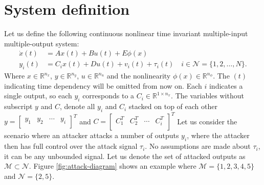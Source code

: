 \section{System definition}\label{ch:system-definition}
Let us define the following continuous nonlinear time invariant multiple-input multiple-output system:
\begin{equation}\label{eqn:standard-system}
    \begin{split}
        \dot{x}(t) &= Ax(t) + Bu(t) + E\phi(x) \\
        y_i(t) &= C_ix(t) + Du(t) + v_i(t) + \tau_i(t) \quad i \in \mathcal{N} = \{1,2,\dots,N\}.
    \end{split}
\end{equation}
Where $x \in \mathbb{R}^{n_x}$, $y \in \mathbb{R}^{n_y}$, $u \in \mathbb{R}^{n_u}$ and the nonlinearity $\phi(x) \in \mathbb{R}^{n_{\phi}}$. The $(t)$ indicating time dependency will be omitted from now on. Each $i$ indicates a single output, so each $y_i$ corresponds to a $C_i \in \mathbb{R}^{1 \times n_x}$. The variables without subscript $y$ and $C$, denote all $y_i$ and $C_i$ stacked on top of each other 
$y = 
\begin{bmatrix}
    y_1 & y_2 & \cdots & y_{i} \\
\end{bmatrix}^{T}$ and
$C =
\begin{bmatrix}
    C_1^T & C_2^T & \cdots & C_i^T \\
\end{bmatrix}^{T}$
Let us consider the scenario where an attacker attacks a number of outputs $y_i$, where the attacker then has full control over the attack signal $\tau_i$. No assumptions are made about $\tau_i$, it can be any unbounded signal. Let us denote the set of attacked outputs as $\mathcal{M} \subset \mathcal{N}$. Figure \ref{fig:attack-diagram} shows an example where $\mathcal{M}=\{1,2,3,4,5\}$ and $\mathcal{N} = \{2,5\}$.  \\

